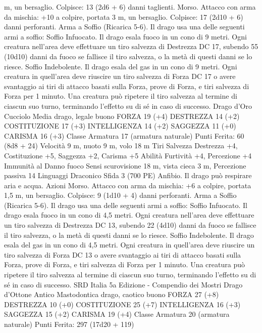 \begin{multicols}{2}
m, un bersaglio.
Colpisce: 13 (2d6 + 6) danni taglienti.
Morso. Attacco con arma da mischia: +10 a colpire, portata 3 m,
un bersaglio.
Colpisce: 17 (2d10 + 6) danni perforanti.
Arma a Soffio (Ricarica 5-6). Il drago usa una delle seguenti armi
a soffio:
Soffio Infuocato. Il drago esala fuoco in un cono di 9 metri. Ogni
creatura nell’area deve effettuare un tiro salvezza di Destrezza DC
17, subendo 55 (10d10) danni da fuoco se fallisce il tiro salvezza, o
la metà di questi danni se lo riesce.
Soffio Indebolente. Il drago esala del gas in un cono di 9 metri. Ogni
creatura in quell’area deve riuscire un tiro salvezza di Forza DC 17 o
avere svantaggio ai tiri di attacco basati sulla Forza, prove di Forza, e
tiri salvezza di Forza per 1 minuto. Una creatura può ripetere il tiro
salvezza al termine di ciascun suo turno, terminando l’effetto su di sé
in caso di successo.
Drago d’Oro Cucciolo
Media drago, legale buono
FORZA 19 (+4)
DESTREZZA 14 (+2)
COSTITUZIONE 17 (+3)
INTELLIGENZA 14 (+2)
SAGGEZZA 11 (+0)
CARISMA 16 (+3)
Classe Armatura 17 (armatura naturale)
\hspace*{0pt}\hfill{Punti Ferita}: 60 (8d8 + 24)
Velocità 9 m, nuoto 9 m, volo 18 m
Tiri Salvezza Destrezza +4, Costituzione +5, Saggezza +2,
Carisma +5
Abilità Furtività +4, Percezione +4
Immunità al Danno fuoco
Sensi scurovisione 18 m, vista cieca 3 m, Percezione passiva 14
Linguaggi Draconico
Sfida 3 (700 PE)
Anfibio. Il drago può respirare aria e acqua.
Azioni
Morso. Attacco con arma da mischia: +6 a colpire, portata 1,5
m, un bersaglio.
Colpisce: 9 (1d10 + 4) danni perforanti.
Arma a Soffio (Ricarica 5-6). Il drago usa una delle seguenti armi
a soffio:
Soffio Infuocato. Il drago esala fuoco in un cono di 4,5 metri. Ogni
creatura nell’area deve effettuare un tiro salvezza di Destrezza DC
13, subendo 22 (4d10) danni da fuoco se fallisce il tiro salvezza, o la
metà di questi danni se lo riesce.
Soffio Indebolente. Il drago esala del gas in un cono di 4,5 metri.
Ogni creatura in quell’area deve riuscire un tiro salvezza di Forza DC
13 o avere svantaggio ai tiri di attacco basati sulla Forza, prove di
Forza, e tiri salvezza di Forza per 1 minuto. Una creatura può ripetere
il tiro salvezza al termine di ciascun suo turno, terminando l’effetto
su di sé in caso di successo.
SRD Italia 5a Edizione - Compendio dei Mostri
Drago d’Ottone Antico
Mastodontica drago, caotico buono
FORZA 27 (+8)
DESTREZZA 10 (+0)
COSTITUZIONE 25 (+7)
INTELLIGENZA 16 (+3)
SAGGEZZA 15 (+2)
CARISMA 19 (+4)
Classe Armatura 20 (armatura naturale)
\hspace*{0pt}\hfill{Punti Ferita}: 297 (17d20 + 119)

\end{multicols}
